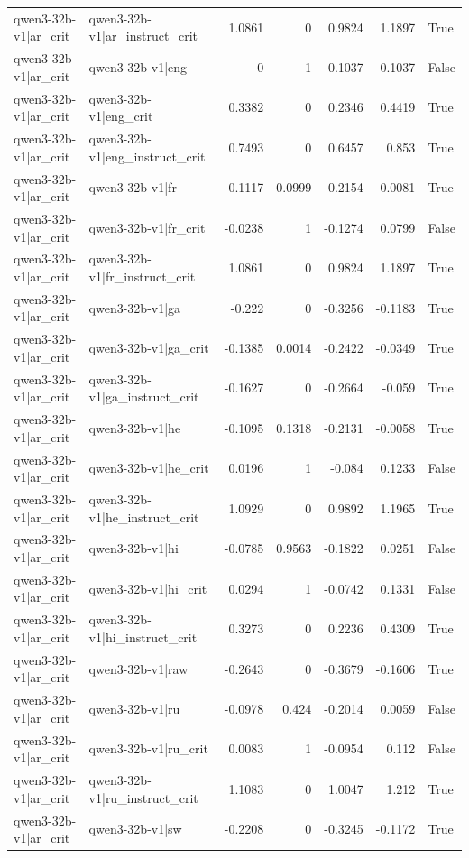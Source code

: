 \begin{table}
\begin{tabular}{l l r r r r l}
qwen3-32b-v1|ar_crit & qwen3-32b-v1|ar_instruct_crit & 1.0861 & 0 & 0.9824 & 1.1897 & True \\
qwen3-32b-v1|ar_crit & qwen3-32b-v1|eng & 0 & 1 & -0.1037 & 0.1037 & False \\
qwen3-32b-v1|ar_crit & qwen3-32b-v1|eng_crit & 0.3382 & 0 & 0.2346 & 0.4419 & True \\
qwen3-32b-v1|ar_crit & qwen3-32b-v1|eng_instruct_crit & 0.7493 & 0 & 0.6457 & 0.853 & True \\
qwen3-32b-v1|ar_crit & qwen3-32b-v1|fr & -0.1117 & 0.0999 & -0.2154 & -0.0081 & True \\
qwen3-32b-v1|ar_crit & qwen3-32b-v1|fr_crit & -0.0238 & 1 & -0.1274 & 0.0799 & False \\
qwen3-32b-v1|ar_crit & qwen3-32b-v1|fr_instruct_crit & 1.0861 & 0 & 0.9824 & 1.1897 & True \\
qwen3-32b-v1|ar_crit & qwen3-32b-v1|ga & -0.222 & 0 & -0.3256 & -0.1183 & True \\
qwen3-32b-v1|ar_crit & qwen3-32b-v1|ga_crit & -0.1385 & 0.0014 & -0.2422 & -0.0349 & True \\
qwen3-32b-v1|ar_crit & qwen3-32b-v1|ga_instruct_crit & -0.1627 & 0 & -0.2664 & -0.059 & True \\
qwen3-32b-v1|ar_crit & qwen3-32b-v1|he & -0.1095 & 0.1318 & -0.2131 & -0.0058 & True \\
qwen3-32b-v1|ar_crit & qwen3-32b-v1|he_crit & 0.0196 & 1 & -0.084 & 0.1233 & False \\
qwen3-32b-v1|ar_crit & qwen3-32b-v1|he_instruct_crit & 1.0929 & 0 & 0.9892 & 1.1965 & True \\
qwen3-32b-v1|ar_crit & qwen3-32b-v1|hi & -0.0785 & 0.9563 & -0.1822 & 0.0251 & False \\
qwen3-32b-v1|ar_crit & qwen3-32b-v1|hi_crit & 0.0294 & 1 & -0.0742 & 0.1331 & False \\
qwen3-32b-v1|ar_crit & qwen3-32b-v1|hi_instruct_crit & 0.3273 & 0 & 0.2236 & 0.4309 & True \\
qwen3-32b-v1|ar_crit & qwen3-32b-v1|raw & -0.2643 & 0 & -0.3679 & -0.1606 & True \\
qwen3-32b-v1|ar_crit & qwen3-32b-v1|ru & -0.0978 & 0.424 & -0.2014 & 0.0059 & False \\
qwen3-32b-v1|ar_crit & qwen3-32b-v1|ru_crit & 0.0083 & 1 & -0.0954 & 0.112 & False \\
qwen3-32b-v1|ar_crit & qwen3-32b-v1|ru_instruct_crit & 1.1083 & 0 & 1.0047 & 1.212 & True \\
qwen3-32b-v1|ar_crit & qwen3-32b-v1|sw & -0.2208 & 0 & -0.3245 & -0.1172 & True \\

\end{tabular}
\end{table}
